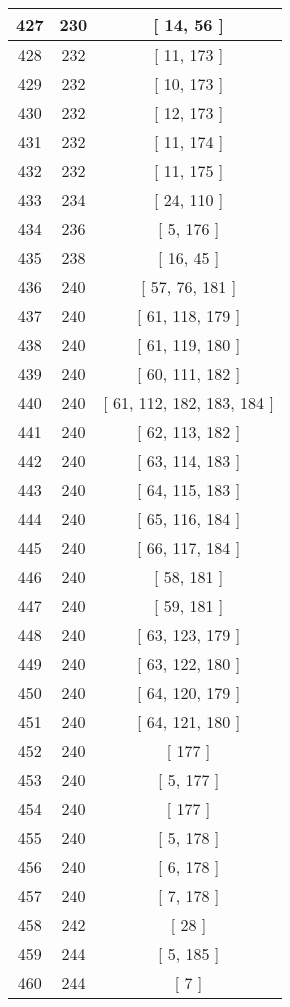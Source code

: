 \begin{center}
\begin{longtable}[H]{|| c c c ||}
\hline
427 & 230 & [ 14, 56 ] \\ 
\hline
428 & 232 & [ 11, 173 ] \\ 
\hline
429 & 232 & [ 10, 173 ] \\ 
\hline
430 & 232 & [ 12, 173 ] \\ 
\hline
431 & 232 & [ 11, 174 ] \\ 
\hline
432 & 232 & [ 11, 175 ] \\ 
\hline
433 & 234 & [ 24, 110 ] \\ 
\hline
434 & 236 & [ 5, 176 ] \\ 
\hline
435 & 238 & [ 16, 45 ] \\ 
\hline
436 & 240 & [ 57, 76, 181 ] \\ 
\hline
437 & 240 & [ 61, 118, 179 ] \\ 
\hline
438 & 240 & [ 61, 119, 180 ] \\ 
\hline
439 & 240 & [ 60, 111, 182 ] \\ 
\hline
440 & 240 & [ 61, 112, 182, 183, 184 ] \\ 
\hline
441 & 240 & [ 62, 113, 182 ] \\ 
\hline
442 & 240 & [ 63, 114, 183 ] \\ 
\hline
443 & 240 & [ 64, 115, 183 ] \\ 
\hline
444 & 240 & [ 65, 116, 184 ] \\ 
\hline
445 & 240 & [ 66, 117, 184 ] \\ 
\hline
446 & 240 & [ 58, 181 ] \\ 
\hline
447 & 240 & [ 59, 181 ] \\ 
\hline
448 & 240 & [ 63, 123, 179 ] \\ 
\hline
449 & 240 & [ 63, 122, 180 ] \\ 
\hline
450 & 240 & [ 64, 120, 179 ] \\ 
\hline
451 & 240 & [ 64, 121, 180 ] \\ 
\hline
452 & 240 & [ 177 ] \\ 
\hline
453 & 240 & [ 5, 177 ] \\ 
\hline
454 & 240 & [ 177 ] \\ 
\hline
455 & 240 & [ 5, 178 ] \\ 
\hline
456 & 240 & [ 6, 178 ] \\ 
\hline
457 & 240 & [ 7, 178 ] \\ 
\hline
458 & 242 & [ 28 ] \\ 
\hline
459 & 244 & [ 5, 185 ] \\ 
\hline
460 & 244 & [ 7 ] \\ 

\end{longtable}
\end{center}
